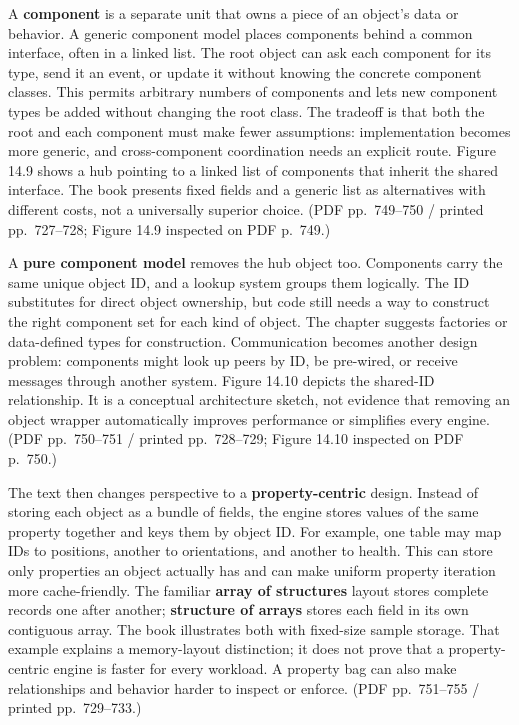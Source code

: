 A \textbf{component} is a separate unit that owns a piece of an object's data or behavior. A generic component model places components behind a common interface, often in a linked list. The root object can ask each component for its type, send it an event, or update it without knowing the concrete component classes. This permits arbitrary numbers of components and lets new component types be added without changing the root class. The tradeoff is that both the root and each component must make fewer assumptions: implementation becomes more generic, and cross-component coordination needs an explicit route. Figure 14.9 shows a  hub pointing to a linked list of components that inherit the shared interface. The book presents fixed fields and a generic list as alternatives with different costs, not a universally superior choice. (PDF pp.~749--750 / printed pp.~727--728; Figure 14.9 inspected on PDF p.~749.)

A \textbf{pure component model} removes the hub object too. Components carry the same unique object ID, and a lookup system groups them logically. The ID substitutes for direct object ownership, but code still needs a way to construct the right component set for each kind of object. The chapter suggests factories or data-defined types for construction. Communication becomes another design problem: components might look up peers by ID, be pre-wired, or receive messages through another system. Figure 14.10 depicts the shared-ID relationship. It is a conceptual architecture sketch, not evidence that removing an object wrapper automatically improves performance or simplifies every engine. (PDF pp.~750--751 / printed pp.~728--729; Figure 14.10 inspected on PDF p.~750.)

The text then changes perspective to a \textbf{property-centric} design. Instead of storing each object as a bundle of fields, the engine stores values of the same property together and keys them by object ID. For example, one table may map IDs to positions, another to orientations, and another to health. This can store only properties an object actually has and can make uniform property iteration more cache-friendly. The familiar \textbf{array of structures} layout stores complete records one after another; \textbf{structure of arrays} stores each field in its own contiguous array. The book illustrates both with fixed-size sample storage. That example explains a memory-layout distinction; it does not prove that a property-centric engine is faster for every workload. A property bag can also make relationships and behavior harder to inspect or enforce. (PDF pp.~751--755 / printed pp.~729--733.)

